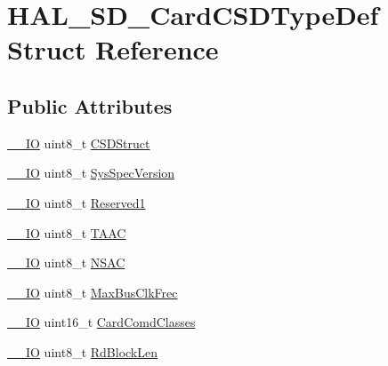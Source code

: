 \hypertarget{struct_h_a_l___s_d___card_c_s_d_type_def}{}\section{H\+A\+L\+\_\+\+S\+D\+\_\+\+Card\+C\+S\+D\+Type\+Def Struct Reference}
\label{struct_h_a_l___s_d___card_c_s_d_type_def}
\subsection*{Public Attributes}
\begin{DoxyCompactItemize}
\item 
\mbox{\hyperlink{core__sc300_8h_aec43007d9998a0a0e01faede4133d6be}{\+\_\+\+\_\+\+IO}} uint8\+\_\+t \mbox{\hyperlink{struct_h_a_l___s_d___card_c_s_d_type_def_a1d3831234ddd56400bb6f81bfa0ab16e}{C\+S\+D\+Struct}}
\item 
\mbox{\hyperlink{core__sc300_8h_aec43007d9998a0a0e01faede4133d6be}{\+\_\+\+\_\+\+IO}} uint8\+\_\+t \mbox{\hyperlink{struct_h_a_l___s_d___card_c_s_d_type_def_ab2211f1630c4adecbafa88e4ddf60fa9}{Sys\+Spec\+Version}}
\item 
\mbox{\hyperlink{core__sc300_8h_aec43007d9998a0a0e01faede4133d6be}{\+\_\+\+\_\+\+IO}} uint8\+\_\+t \mbox{\hyperlink{struct_h_a_l___s_d___card_c_s_d_type_def_a2256509272f03fa407592ca84cf85c23}{Reserved1}}
\item 
\mbox{\hyperlink{core__sc300_8h_aec43007d9998a0a0e01faede4133d6be}{\+\_\+\+\_\+\+IO}} uint8\+\_\+t \mbox{\hyperlink{struct_h_a_l___s_d___card_c_s_d_type_def_afc274a8df841419bb821e2796f91c76a}{T\+A\+AC}}
\item 
\mbox{\hyperlink{core__sc300_8h_aec43007d9998a0a0e01faede4133d6be}{\+\_\+\+\_\+\+IO}} uint8\+\_\+t \mbox{\hyperlink{struct_h_a_l___s_d___card_c_s_d_type_def_ad1e4e53e354411d6142f69780c243bb8}{N\+S\+AC}}
\item 
\mbox{\hyperlink{core__sc300_8h_aec43007d9998a0a0e01faede4133d6be}{\+\_\+\+\_\+\+IO}} uint8\+\_\+t \mbox{\hyperlink{struct_h_a_l___s_d___card_c_s_d_type_def_adf2c7783be8bf4759b5f92b047a70056}{Max\+Bus\+Clk\+Frec}}
\item 
\mbox{\hyperlink{core__sc300_8h_aec43007d9998a0a0e01faede4133d6be}{\+\_\+\+\_\+\+IO}} uint16\+\_\+t \mbox{\hyperlink{struct_h_a_l___s_d___card_c_s_d_type_def_a7f9634f4002f2e45c6d681260bea90d3}{Card\+Comd\+Classes}}
\item 
\mbox{\hyperlink{core__sc300_8h_aec43007d9998a0a0e01faede4133d6be}{\+\_\+\+\_\+\+IO}} uint8\+\_\+t \mbox{\hyperlink{struct_h_a_l___s_d___card_c_s_d_type_def_af9274657d46bdba7746e23783ae010ae}{Rd\+Block\+Len}}

\end{DoxyCompactItemize}
